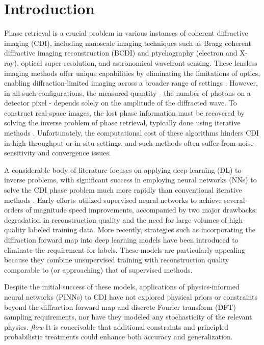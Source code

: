 \documentclass[sn-mathphys]{sn-jnl}%
\theoremstyle{thmstyleone}%
\theoremstyle{thmstyletwo}%
\theoremstyle{thmstylethree}%
\begin{document}
\section{Introduction }\label{sec1}
Phase retrieval is a crucial problem in various instances of coherent diffractive imaging (CDI), including nanoscale imaging techniques such as Bragg coherent diffractive imaging reconstruction (BCDI) and ptychography (electron and X-ray), optical super-resolution, and astronomical wavefront sensing. These lensless imaging methods offer unique capabilities by eliminating the limitations of optics, enabling diffraction-limited imaging across a broader range of settings \cite{dean2006phase, heintzmann2021answers, miao2015beyond}. However, in all such configurations, the measured quantity - the number of photons on a detector pixel - depends solely on the amplitude of the diffracted wave. To construct real-space images, the lost phase information must be recovered by solving the inverse problem of phase retrieval, typically done using iterative methods \cite{epie}. Unfortunately, the computational cost of these algorithms hinders CDI in high-throughput or in situ settings, and such methods often suffer from noise sensitivity and convergence issues.

A considerable body of literature focuses on applying deep learning (DL) to inverse problems, with significant success in employing neural networks (NNs) to solve the CDI phase problem much more rapidly than conventional iterative methods \cite{ratner2021recovering,yao2022autophasenn}. Early efforts utilized supervised neural networks to achieve several-orders of magnitude speed improvements, accompanied by two major drawbacks: degradation in reconstruction quality and the need for large volumes of high-quality labeled training data. More recently, strategies such as incorporating the diffraction forward map into deep learning models have been introduced to eliminate the requirement for labels. These models are particularly appealing because they combine unsupervised training with reconstruction quality comparable to (or approaching) that of supervised methods.

Despite the initial success of these models, applications of physics-informed neural networks (PINNs) to CDI have not explored physical priors or constraints beyond the diffraction forward map and discrete Fourier transform (DFT) sampling requirements, nor have they modeled any stochasticity of the relevant physics. \emph{flow} It is conceivable that additional constraints and principled probabilistic treatments could enhance both accuracy and generalization.
\end{document}
